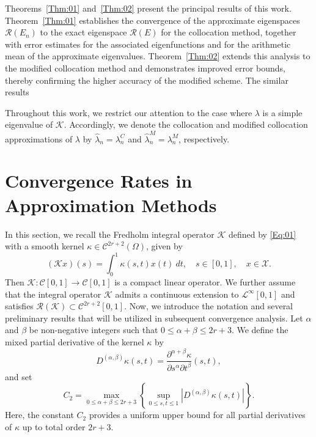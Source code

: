 \documentclass[]{interact}
\theoremstyle{plain}%
\theoremstyle{definition}
\theoremstyle{remark}
\begin{document}
\noindent
Theorems~\ref{Thm:01} and~\ref{Thm:02} present the principal results of this work. Theorem~\ref{Thm:01} establishes the convergence of the approximate eigenspaces $\mathcal{R}(E_n)$ to the exact eigenspace $\mathcal{R}(E)$ for the collocation method, together with error estimates for the associated eigenfunctions and for the arithmetic mean of the approximate eigenvalues. Theorem~\ref{Thm:02} extends this analysis to the modified collocation method and demonstrates improved error bounds, thereby confirming the higher accuracy of the modified scheme. The similar results




Throughout this work, we restrict our attention to the case where 
$\lambda$ is a simple eigenvalue of $\mathcal{K}$. 
Accordingly, we denote the collocation and modified collocation 
approximations of $\lambda$ by 
$\hat{\lambda}_n = \lambda_n^{C}$ and 
$\hat{\lambda}_n^{M} = \lambda_n^{M}$, respectively.

\section{Convergence Rates in Approximation Methods}
In this section, we recall the Fredholm integral operator $\mathcal{K}$ defined by \eqref{Eq:01} with a smooth kernel 
$\kappa \in \mathcal{C}^{2r+2}(\Omega)$, given by
\begin{equation*} 
	(\mathcal{K}x)(s) = \int_{0}^{1} \kappa(s, t) x(t)~dt, 
	\quad  s \in [0,1], \quad x \in \mathcal{X}.
\end{equation*}
Then $\mathcal{K} : \mathcal{C}[0,1] \to \mathcal{C}[0,1]$ is a compact linear operator.
We further assume that the integral operator $\mathcal{K}$ admits a continuous
extension to $\mathcal{L}^\infty[0,1]$ and satisfies
$
\mathcal{R}(\mathcal{K}) \subset \mathcal{C}^{2r+2}[0,1].
$
Now, we introduce the notation and several preliminary results that will be utilized in subsequent convergence analysis.  
Let $\alpha$ and $\beta$ be non-negative integers such that $0 \le \alpha + \beta \le 2r + 3$. We define the mixed partial derivative of the kernel $\kappa$ by
\begin{equation*}
	D^{(\alpha,\beta)}\kappa(s,t) = 
	\frac{\partial^{\alpha+\beta}\kappa}{\partial s^\alpha \partial t^\beta}(s,t),
\end{equation*}
and set
\begin{equation*}
	C_2 = \max_{0 \le \alpha + \beta \le 2r+3} 
	\left\{
	\sup_{0 \le s,t \le 1} 
	\left| D^{(\alpha,\beta)}\kappa(s,t) \right|
	\right\}.
\end{equation*}
Here, the constant $C_2$ provides a uniform upper bound for all partial derivatives of $\kappa$ up to total order $2r+3$.
\end{document}
